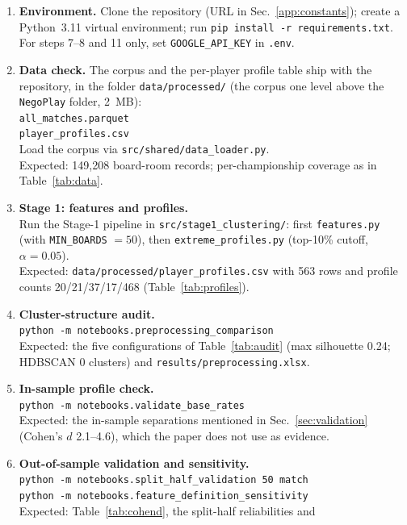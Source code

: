 \documentclass[11pt,a4paper]{article}
\begin{document}
\begin{enumerate}
  \item \textbf{Environment.} Clone the repository (URL in
  Sec.~\ref{app:constants}); create a Python~3.11 virtual environment;
  run \texttt{pip install -r requirements.txt}. For steps 7--8 and 11
  only, set \texttt{GOOGLE\_API\_KEY} in \texttt{.env}.
  \item \textbf{Data check.} The corpus and the per-player profile
  table ship with the repository, in the folder
  \texttt{data/processed/} (the corpus one level above the
  \texttt{NegoPlay} folder, 2~MB):\\
  \texttt{all\_matches.parquet}\\
  \texttt{player\_profiles.csv}\\
  Load the corpus via \texttt{src/shared/data\_loader.py}.\\
  Expected: 149{,}208 board-room records; per-championship coverage as
  in Table~\ref{tab:data}.
  \item \textbf{Stage 1: features and profiles.}\\
  Run the Stage-1 pipeline in \texttt{src/stage1\_clustering/}: first
  \texttt{features.py} (with \texttt{MIN\_BOARDS} $=50$), then
  \texttt{extreme\_profiles.py} (top-10\% cutoff, $\alpha=0.05$).\\
  Expected: \texttt{data/processed/player\_profiles.csv} with 563 rows
  and profile counts 20/21/37/17/468 (Table~\ref{tab:profiles}).
  \item \textbf{Cluster-structure audit.}\\
  \texttt{python -m notebooks.preprocessing\_comparison}\\
  Expected: the five configurations of Table~\ref{tab:audit} (max
  silhouette 0.24; HDBSCAN 0 clusters) and
  \texttt{results/preprocessing.xlsx}.
  \item \textbf{In-sample profile check.}\\
  \texttt{python -m notebooks.validate\_base\_rates}\\
  Expected: the in-sample separations mentioned in
  Sec.~\ref{sec:validation} (Cohen's $d$ 2.1--4.6), which the paper
  does not use as evidence.
  \item \textbf{Out-of-sample validation and sensitivity.}\\
  \texttt{python -m notebooks.split\_half\_validation 50 match}\\
  \texttt{python -m notebooks.feature\_definition\_sensitivity}\\
  Expected: Table~\ref{tab:cohend}, the split-half reliabilities and

\end{enumerate}
\end{document}
